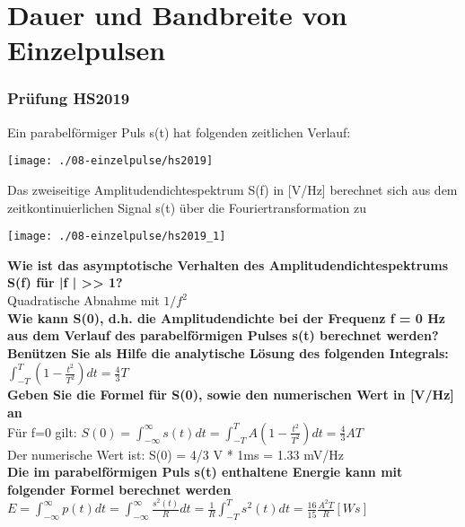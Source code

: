 

\section{Dauer und Bandbreite von Einzelpulsen}

\subsubsection{Prüfung HS2019}
Ein parabelförmiger Puls s(t) hat folgenden zeitlichen Verlauf:
\begin{center}
    \vspace{-8pt}
    \texttt{[image: ./08-einzelpulse/hs2019]}
    \vspace{-8pt}
\end{center}

Das zweiseitige Amplitudendichtespektrum S(f) in [V/Hz] berechnet sich aus dem zeitkontinuierlichen Signal s(t) über die Fouriertransformation zu
\begin{center}
    \vspace{-8pt}
    \texttt{[image: ./08-einzelpulse/hs2019\_1]}
    \vspace{-8pt}
\end{center}

\textbf{Wie ist das asymptotische Verhalten des Amplitudendichtespektrums S(f) für |f | >> 1?}\\
Quadratische Abnahme mit $1/f^2$\\

\textbf{Wie kann S(0), d.h. die Amplitudendichte bei der Frequenz f = 0 Hz aus dem Verlauf des parabelförmigen Pulses s(t) berechnet werden? Benützen Sie als Hilfe die analytische
Lösung des folgenden Integrals:}\\
$\int_{-T}^{T} (1-\frac{t^2}{T^2})dt=\frac{4}{3}T$\\

\textbf{Geben Sie die Formel für S(0), sowie den numerischen Wert in [V/Hz] an}\\
Für f=0 gilt: $S(0)=\int_{-\infty}^{\infty}s(t)dt=\int_{-T}^{T}A(1-\frac{t^2}{T^2})dt=\frac{4}{3}AT$\\
Der numerische Wert ist: S(0) = 4/3 V * 1ms = 1.33 mV/Hz\\

\textbf{Die im parabelförmigen Puls s(t) enthaltene Energie kann mit folgender Formel berechnet werden}\\
$E=\int_{-\infty}^{\infty}p(t)dt=\int_{-\infty}^{\infty}\frac{s^2(t)}{R}dt=\frac{1}{R}\int_{-T}^{T}s^2(t)dt=\frac{16}{15}\frac{A^2T}{R} [Ws]$\\

